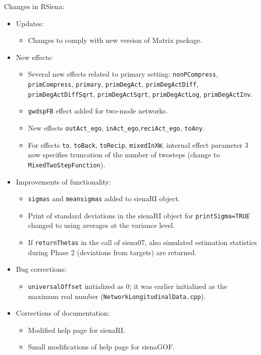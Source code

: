 \documentclass[a4paper,fleqn,11pt]{article}
\newcommand{\+}{\, + \,}
\newcommand{\sfn}[1]{\textsf{#1}}
\begin{document}
\begin{small}
\begin{itemize}
Changes in RSiena:
\begin{itemize}
\item Updates:
   \begin{itemize}
   \item Changes to comply with new version of \sfn{Matrix} package.
    \end{itemize}
\item New effects:
   \begin{itemize}
  \item Several new effects related to primary setting:
    \texttt{nonPCompress}, \texttt{primCompress}, \texttt{primary}, \texttt{primDegAct},
    \texttt{primDegActDiff}, \texttt{primDegActDiffSqrt}, \texttt{primDegActSqrt},
    \texttt{primDegActLog}, \texttt{primDegActInv}.
  \item \texttt{gwdspFB} effect added for two-mode networks.
  \item New effects \texttt{outAct\_ego}, \texttt{inAct\_ego},\texttt{reciAct\_ego}, \texttt{toAny}.
  \item For effects \texttt{to}, \texttt{toBack}, \texttt{toRecip}, \texttt{mixedInXW},
    internal effect parameter 3 now specifies truncation of the number of
    twosteps (change to \texttt{MixedTwoStepFunction}).
    \end{itemize}
\item Improvements of functionality:
   \begin{itemize}
  \item \texttt{sigmas} and \texttt{meansigmas} added to \sfn{sienaRI} object.
  \item Print of standard deviations in the \sfn{sienaRI} object for \texttt{printSigma=TRUE}
    changed to using averages at the variance level.
  \item If \texttt{returnThetas} in the call of \textsf{siena07}, also simulated estimation statistics
    during Phase 2 (deviations from targets) are returned.
    \end{itemize}
\item Bug corrections:
   \begin{itemize}
  \item \texttt{universalOffset} initialized as 0; it was earlier initialized as
    the maximum real number (\texttt{NetworkLongitudinalData.cpp}).
    \end{itemize}
\item Corrections of documentation:
   \begin{itemize}
  \item Modified help page for \sfn{sienaRI}.
  \item Small modifications of help page for \textsf{sienaGOF}.
   \end{itemize}
\end{itemize}


\end{itemize}
\end{small}
\end{document}

